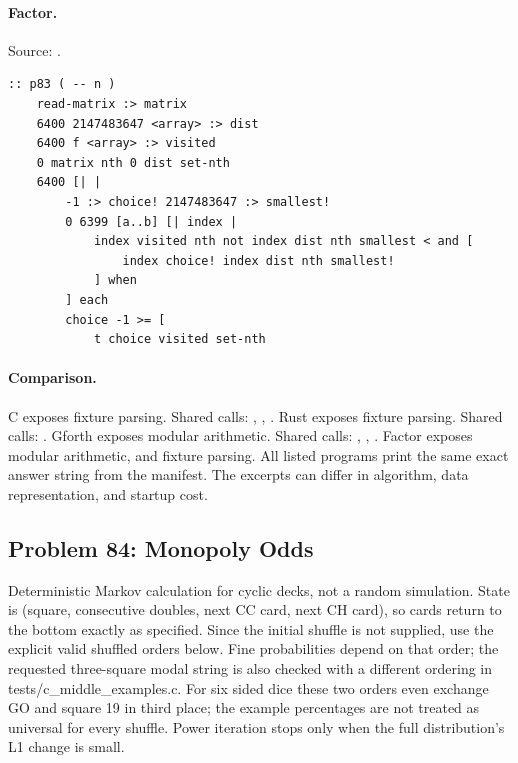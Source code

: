 \paragraph{Factor.} Source: .
\begin{lstlisting}
:: p83 ( -- n )
    read-matrix :> matrix
    6400 2147483647 <array> :> dist
    6400 f <array> :> visited
    0 matrix nth 0 dist set-nth
    6400 [| |
        -1 :> choice! 2147483647 :> smallest!
        0 6399 [a..b] [| index |
            index visited nth not index dist nth smallest < and [
                index choice! index dist nth smallest!
            ] when
        ] each
        choice -1 >= [
            t choice visited set-nth
\end{lstlisting}

\paragraph{Comparison.}
C exposes fixture parsing. Shared calls: \texttt{}, \texttt{}, \texttt{}. Rust exposes fixture parsing. Shared calls: \texttt{}. Gforth exposes modular arithmetic. Shared calls: \texttt{}, \texttt{}, \texttt{}. Factor exposes modular arithmetic, and fixture parsing.
All listed programs print the same exact answer string from the manifest. The excerpts can differ in algorithm, data representation, and startup cost.

\subsection{Problem 84: Monopoly Odds}
\label{walkthrough:p84}
Deterministic Markov calculation for cyclic decks, not a random simulation. State is (square, consecutive doubles, next CC card, next CH card), so cards return to the bottom exactly as specified. Since the initial shuffle is not supplied, use the explicit valid shuffled orders below. Fine probabilities depend on that order; the requested three-square modal string is also checked with a different ordering in tests/c\_middle\_examples.c. For six sided dice these two orders even exchange GO and square 19 in third place; the example percentages are not treated as universal for every shuffle. Power iteration stops only when the full distribution's L1 change is small.

